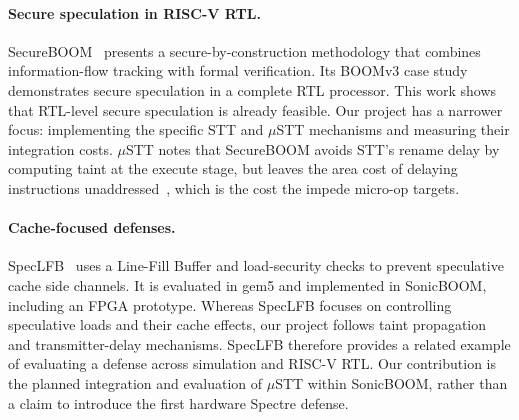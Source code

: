 \paragraph{Secure speculation in RISC-V RTL.}
SecureBOOM~\cite{Jauch:SecureBOOM:2023} presents a
secure-by-construction methodology that combines
information-flow tracking with formal verification.
Its BOOMv3 case study demonstrates secure speculation
in a complete RTL processor.
This work shows that RTL-level secure speculation is
already feasible. Our project has a narrower focus:
implementing the specific STT and $\mu$STT mechanisms
and measuring their integration costs.
$\mu$STT notes that SecureBOOM avoids STT's rename delay
by computing taint at the execute stage, but leaves the
area cost of delaying instructions
unaddressed~\cite{Chen:uSTT:2025}, which is the cost
the impede micro-op targets.

\paragraph{Cache-focused defenses.}
SpecLFB~\cite{Cheng:SpecLFB:2024} uses a Line-Fill Buffer
and load-security checks to prevent speculative
cache side channels.
It is evaluated in gem5 and implemented in SonicBOOM,
including an FPGA prototype.
Whereas SpecLFB focuses on controlling speculative
loads and their cache effects, our project follows
taint propagation and transmitter-delay mechanisms.
SpecLFB therefore provides a related example of
evaluating a defense across simulation and RISC-V RTL.
Our contribution is the planned integration and
evaluation of $\mu$STT within SonicBOOM, rather than
a claim to introduce the first hardware Spectre defense.
